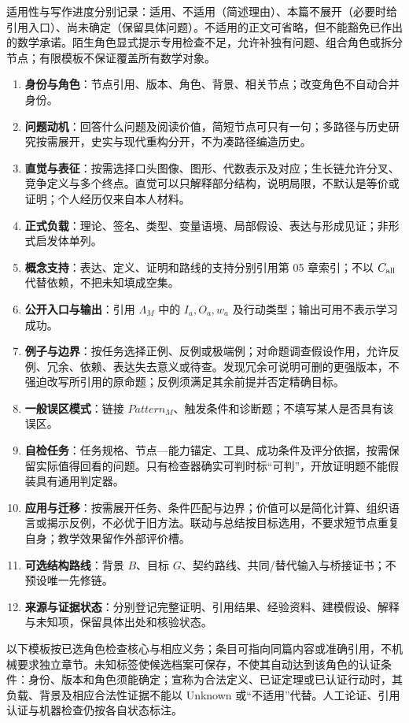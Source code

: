 \documentclass[UTF8,a4paper,zihao=-4,fontset=windows,openany]{ctexbook}
\begin{document}
适用性与写作进度分别记录：适用、不适用（简述理由）、本篇不展开（必要时给引用入口）、尚未确定（保留具体问题）。不适用的正文可省略，但不能豁免已作出的数学承诺。陌生角色显式提示专用检查不足，允许补独有问题、组合角色或拆分节点；有限模板不保证覆盖所有数学对象。

\begin{enumerate}
\item \textbf{身份与角色}：节点引用、版本、角色、背景、相关节点；改变角色不自动合并身份。
\item \textbf{问题动机}：回答什么问题及阅读价值，简短节点可只有一句；多路径与历史研究按需展开，史实与现代重构分开，不为凑路径编造历史。
\item \textbf{直觉与表征}：按需选择口头图像、图形、代数表示及对应；生长链允许分叉、竞争定义与多个终点。直觉可以只解释部分结构，说明局限，不默认是等价或证明；个人经历仅来自本人材料。
\item \textbf{正式负载}：理论、签名、类型、变量语境、局部假设、表达与形成见证；非形式启发体单列。
\item \textbf{概念支持}：表达、定义、证明和路线的支持分别引用第 05 章索引；不以 \(C_{\rm all}\) 代替依赖，不把未知填成空集。
\item \textbf{公开入口与输出}：引用 \(\Lambda_M\) 中的 \(I_a,O_a,w_a\) 及行动类型；输出可用不表示学习成功。
\item \textbf{例子与边界}：按任务选择正例、反例或极端例；对命题调查假设作用，允许反例、冗余、依赖、表达失去意义或待查。发现冗余可说明可删的更强版本，不强迫改写所引用的原命题；反例须满足其余前提并否定精确目标。
\item \textbf{一般误区模式}：链接 \(Pattern_M\)、触发条件和诊断题；不填写某人是否具有该误区。
\item \textbf{自检任务}：任务规格、节点—能力锚定、工具、成功条件及评分依据，按需保留实际值得回看的问题。只有检查器确实可判时标“可判”，开放证明题不能假装具有通用判定器。
\item \textbf{应用与迁移}：按需展开任务、条件匹配与边界；价值可以是简化计算、组织语言或揭示反例，不必优于旧方法。联动与总结按目标选用，不要求短节点重复自身；教学效果留作外部评价槽。
\item \textbf{可选结构路线}：背景 \(B\)、目标 \(G\)、契约路线、共同/替代输入与桥接证书；不预设唯一先修链。
\item \textbf{来源与证据状态}：分别登记完整证明、引用结果、经验资料、建模假设、解释与未知项，保留具体出处和核验状态。
\end{enumerate}
以下模板按已选角色检查核心与相应义务；条目可指向同篇内容或准确引用，不机械要求独立章节。未知标签使候选档案可保存，不使其自动达到该角色的认证条件：身份、版本和角色须能确定；宣称为合法定义、已证定理或已认证行动时，其负载、背景及相应合法性证据不能以 Unknown 或“不适用”代替。人工论证、引用认证与机器检查仍按各自状态标注。
\end{document}
